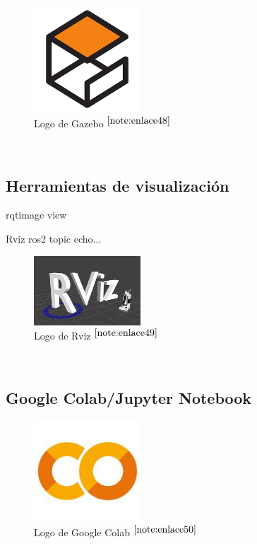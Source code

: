 \begin{figure} [h!]
	\begin{center}
		\includegraphics[width=4cm]{figs/gazebo.png}
	\end{center}
	\caption{Logo de Gazebo $^{\ref{note:enlace48}}$} 
	\label{fig:gazebo}
\end{figure}\

\setcounter{footnote}{48} %

\subsection{Herramientas de visualización}

rqtimage view

Rviz
ros2 topic echo...

\begin{figure} [h!]
	\begin{center}
		\includegraphics[width=4cm]{figs/rviz.png}
	\end{center}
	\caption{Logo de Rviz $^{\ref{note:enlace49}}$} 
	\label{fig:rviz}
\end{figure}\

\setcounter{footnote}{49} %

\subsection{Google Colab/Jupyter Notebook}

\begin{figure} [h!]
	\begin{center}
		\includegraphics[width=4cm]{figs/googlecolab.png}
	\end{center}
	\caption{Logo de Google Colab $^{\ref{note:enlace50}}$} 
	\label{fig:googlecolab}
\end{figure}\

